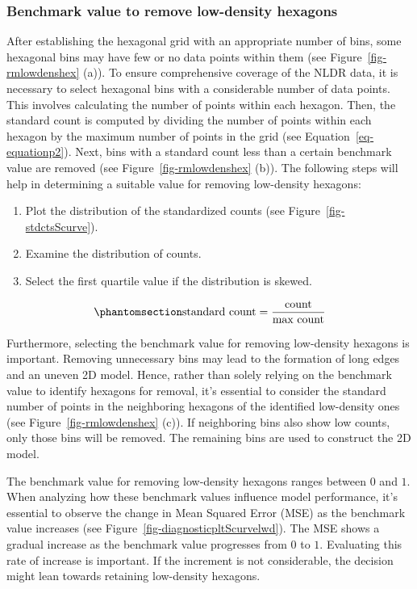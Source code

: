\documentclass[
  12pt]{article}
\providecommand{\tightlist}{%
  \setlength{\itemsep}{0pt}\setlength{\parskip}{0pt}}\usepackage{longtable,booktabs,array}
\begin{document}
\subsubsection{Benchmark value to remove low-density
hexagons}\label{benchmark-value-to-remove-low-density-hexagons}

After establishing the hexagonal grid with an appropriate number of
bins, some hexagonal bins may have few or no data points within them
(see Figure~\ref{fig-rmlowdenshex} (a)). To ensure comprehensive
coverage of the NLDR data, it is necessary to select hexagonal bins with
a considerable number of data points. This involves calculating the
number of points within each hexagon. Then, the standard count is
computed by dividing the number of points within each hexagon by the
maximum number of points in the grid (see Equation~\ref{eq-equationp2}).
Next, bins with a standard count less than a certain benchmark value are
removed (see Figure~\ref{fig-rmlowdenshex} (b)). The following steps
will help in determining a suitable value for removing low-density
hexagons:

\begin{enumerate}
\def\labelenumi{\arabic{enumi}.}
\tightlist
\item
  Plot the distribution of the standardized counts (see
  Figure~\ref{fig-stdctsScurve}).
\item
  Examine the distribution of counts.
\item
  Select the first quartile value if the distribution is skewed.
\end{enumerate}

\begin{equation}\phantomsection\label{eq-equationp2}{
\text{standard count} = \frac{\text{count}}{\text{max count}} 
}\end{equation}

Furthermore, selecting the benchmark value for removing low-density
hexagons is important. Removing unnecessary bins may lead to the
formation of long edges and an uneven 2D model. Hence, rather than
solely relying on the benchmark value to identify hexagons for removal,
it's essential to consider the standard number of points in the
neighboring hexagons of the identified low-density ones (see
Figure~\ref{fig-rmlowdenshex} (c)). If neighboring bins also show low
counts, only those bins will be removed. The remaining bins are used to
construct the 2D model.

The benchmark value for removing low-density hexagons ranges between
\(0\) and \(1\). When analyzing how these benchmark values influence
model performance, it's essential to observe the change in Mean Squared
Error (MSE) as the benchmark value increases (see
Figure~\ref{fig-diagnosticpltScurvelwd}). The MSE shows a gradual
increase as the benchmark value progresses from \(0\) to \(1\).
Evaluating this rate of increase is important. If the increment is not
considerable, the decision might lean towards retaining low-density
hexagons.
\end{document}
